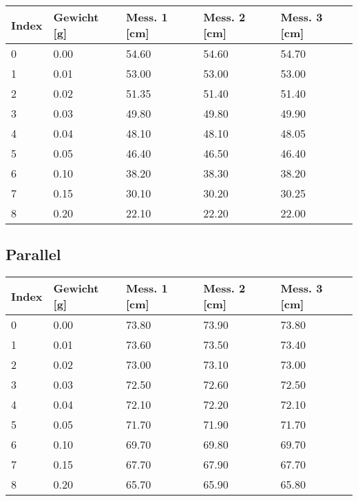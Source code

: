 \documentclass[../main.tex]{subfiles} %
\begin{document}
    \begin{center}
        \begin{tabular}{ |l|l|l|l|l| } \hline\rowcolor{Gray!50}
            Index & Gewicht [g] & Mess. 1 [cm] & Mess. 2 [cm] & Mess. 3 [cm] \\\toprule\hline
            0     & 0.00        & 54.60        & 54.60        & 54.70        \\\hline
            1     & 0.01        & 53.00        & 53.00        & 53.00        \\\hline
            2     & 0.02        & 51.35        & 51.40        & 51.40        \\\hline
            3     & 0.03        & 49.80        & 49.80        & 49.90        \\\hline
            4     & 0.04        & 48.10        & 48.10        & 48.05        \\\hline
            5     & 0.05        & 46.40        & 46.50        & 46.40        \\\hline
            6     & 0.10        & 38.20        & 38.30        & 38.20        \\\hline
            7     & 0.15        & 30.10        & 30.20        & 30.25        \\\hline
            8     & 0.20        & 22.10        & 22.20        & 22.00        \\\hline
        \end{tabular}
    \end{center}

    \subsection{Parallel}\label{sec:parallel}

    \begin{center}
        \begin{tabular}{ |l|l|l|l|l| } \hline\rowcolor{Gray!50}
            Index & Gewicht [g] & Mess. 1 [cm] & Mess. 2 [cm] & Mess. 3 [cm] \\\toprule\hline
            0     & 0.00        & 73.80        & 73.90        & 73.80        \\\hline
            1     & 0.01        & 73.60        & 73.50        & 73.40        \\\hline
            2     & 0.02        & 73.00        & 73.10        & 73.00        \\\hline
            3     & 0.03        & 72.50        & 72.60        & 72.50        \\\hline
            4     & 0.04        & 72.10        & 72.20        & 72.10        \\\hline
            5     & 0.05        & 71.70        & 71.90        & 71.70        \\\hline
            6     & 0.10        & 69.70        & 69.80        & 69.70        \\\hline
            7     & 0.15        & 67.70        & 67.90        & 67.70        \\\hline
            8     & 0.20        & 65.70        & 65.90        & 65.80        \\\hline
        \end{tabular}
    \end{center}
\end{document}
